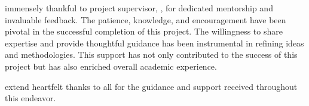 \begin{justify}
	\setlength{\parindent}{1cm}\indent {} immensely thankful to  project supervisor,  {\projguidename}, for dedicated mentorship and invaluable feedback. The patience, knowledge, and encouragement have been pivotal in the successful completion of this project. The willingness to share expertise and provide thoughtful guidance has been instrumental in refining  ideas and methodologies. This support has not only contributed to the success of this project but has also enriched  overall academic experience.
\end{justify}
\begin{justify}
	\setlength{\parindent}{1cm}\indent {} extend  heartfelt thanks to all for the guidance and support received
	throughout this endeavor.
\end{justify}
\pagebreak
